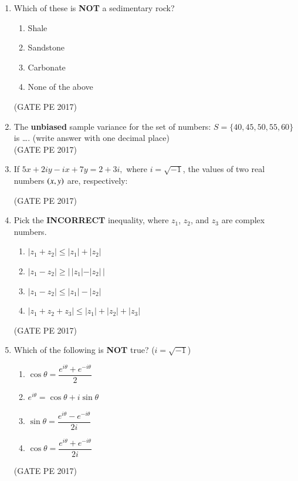\documentclass[journal,12pt,onecolumn]{IEEEtran}
\theoremstyle{remark}
\begin{document}
\begin{enumerate}
\item Which of these is \textbf{NOT} a sedimentary rock?
\begin{enumerate}
\item Shale
\item Sandstone
\item Carbonate
\item None of the above
\end{enumerate}
\hfill{(GATE PE 2017)}

\item The \textbf{unbiased} sample variance for the set of numbers: $S = \{40, 45, 50, 55, 60\}$ is \dots. (write answer with one decimal place)\\

\hfill{(GATE PE 2017)}

\item If $ 5x + 2iy - ix + 7y = 2 + 3i,$ where $i = \sqrt{-1}$, the values of two real numbers $\left(x, y\right)$ are, respectively:
\begin{enumerate}
\end{enumerate}
\hfill{(GATE PE 2017)}

\item Pick the \textbf{INCORRECT} inequality, where $z_1$, $z_2$, and $z_3$ are complex numbers.
\begin{enumerate}
\item $|z_1 + z_2| \leq |z_1| + |z_2|$
\item $|z_1 - z_2| \geq |\,|z_1| - |z_2|\,|$
\item $|z_1 - z_2| \leq |z_1| - |z_2|$
\item $|z_1 + z_2 + z_3| \leq |z_1| + |z_2| + |z_3|$
\end{enumerate}
\hfill{(GATE PE 2017)}

\item Which of the following is \textbf{NOT} true? ($i = \sqrt{-1}$)
\begin{enumerate}
\item $\cos \theta = \dfrac{e^{i\theta} + e^{-i\theta}}{2}$
\item $e^{i\theta} = \cos \theta + i \sin \theta$
\item $\sin \theta = \dfrac{e^{i\theta} - e^{-i\theta}}{2i}$
\item $\cos \theta = \dfrac{e^{i\theta} + e^{-i\theta}}{2i}$
\end{enumerate}
\hfill{(GATE PE 2017)}


\end{enumerate}
\end{document}
